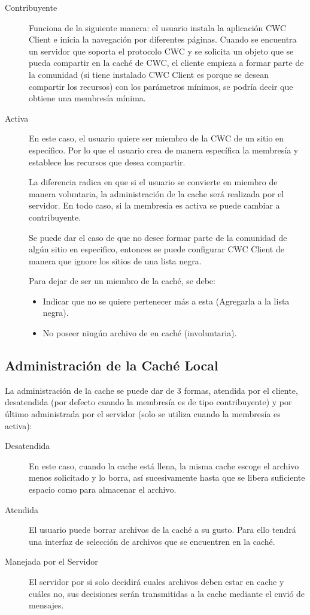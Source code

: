 \begin{description}
\item[Contribuyente] Funciona de la siguiente manera: el usuario instala la aplicación CWC Client e inicia la navegación por diferentes páginas. Cuando se encuentra un servidor que soporta el protocolo CWC y se solicita un objeto que se pueda compartir en la caché de CWC, el cliente empieza a formar parte de la comunidad (si tiene instalado CWC Client es porque se desean compartir los recursos) con los parámetros mínimos, se podría decir que obtiene una membresía mínima.

\item[Activa] En este caso, el usuario quiere ser miembro de la CWC de un sitio en específico. Por lo que el usuario crea de manera específica la membresía y establece los recursos que desea compartir.

La diferencia radica en que si el usuario se convierte en miembro de manera voluntaria, la administración de la cache será realizada por el servidor. En todo caso, si la membresía es activa se puede cambiar a contribuyente.

Se puede dar el caso de que no desee formar parte de la comunidad de algún sitio en especifico, entonces se puede configurar CWC Client de manera que ignore los sitios de una lista negra.

Para dejar de ser un miembro de la caché, se debe:

\begin{itemize}
\item Indicar que no se quiere pertenecer más a esta (Agregarla a la lista negra).
\item No poseer ningún archivo de en caché (involuntaria).
\end{itemize}

\end{description}


\subsection{Administración de la Caché Local}

La administración de la cache se puede dar de 3 formas, atendida por el cliente, desatendida (por defecto cuando la membresía es de tipo contribuyente) y por último administrada por el servidor (solo se utiliza cuando la membresía es activa):

\begin{description}
\item[Desatendida] En este caso, cuando la cache está llena, la misma cache escoge el archivo menos solicitado y lo borra, así sucesivamente hasta que se libera suficiente espacio como para almacenar el archivo. 
\item[Atendida] El usuario puede borrar archivos de la caché a su gusto. Para ello tendrá una interfaz de selección de archivos que se encuentren en la caché.
\item[Manejada por el Servidor] El servidor por si solo decidirá cuales archivos deben estar en cache y cuáles no, sus decisiones serán transmitidas a la cache mediante el envió de mensajes. 
\end{description}


